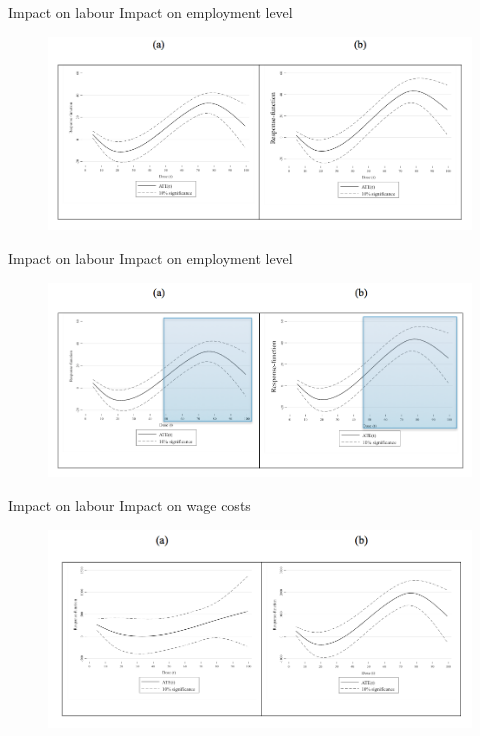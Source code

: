 \documentclass[10pt,handout,xcolor=pdftex,dvipsnames,table]{beamer}
\begin{document}
\begin{frame}{Impact on labour}
Impact on employment level
\begin{figure}[t]
\centering
\includegraphics[width=1\textwidth]{./Figs/EL1.png}
\end{figure}
\end{frame}
\begin{frame}{Impact on labour}
Impact on employment level
\begin{figure}[t]
\centering
\includegraphics[width=1\textwidth]{./Figs/EL1shad.png}
\end{figure}
\end{frame}
\begin{frame}{Impact on labour}
Impact on wage costs
\begin{figure}[t]
\centering
\includegraphics[width=1\textwidth]{./Figs/TLC.png}
\end{figure}
\end{frame}
\end{document}
